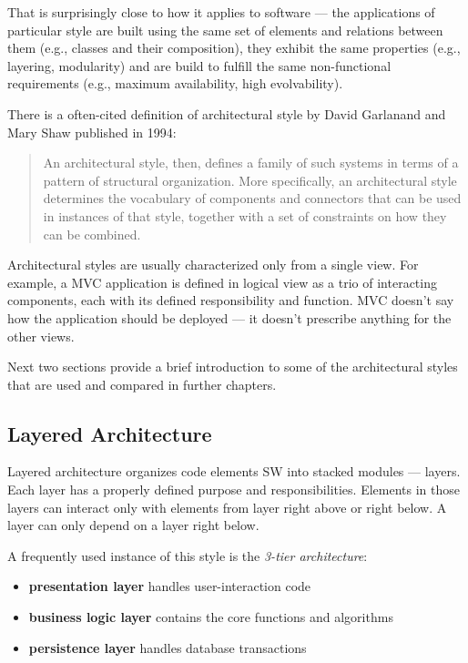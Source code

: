\documentclass[thesis=M,english,hidelinks]{FITthesis}[2012/10/20]
\begin{document}
That is surprisingly close to how it applies to software --- the applications of particular style are built using the same set of elements and relations between them (e.g., classes and their composition), they exhibit the same properties (e.g., layering, modularity) and are build to fulfill the same non-functional requirements (e.g., maximum availability, high evolvability).

There is a often-cited definition of architectural style by David Garlanand and Mary Shaw published in 1994:
\begin{quote}
An architectural style, then, defines a family of such systems in terms of a pattern of structural organization. More specifically, an architectural style determines the vocabulary of components and connectors that can be used in instances of that style, together with a set of constraints on how they can be combined.~\cite{sa-intro-garlan-shaw}
\end{quote}

Architectural styles are usually characterized only from a single view. For example, a \acrfull{MVC} application is defined in logical view as a trio of interacting components, each with its defined responsibility and function. \acrshort{MVC} doesn't say how the application should be deployed --- it doesn't prescribe anything for the other views. 

Next two sections provide a brief introduction to some of the architectural styles that are used and compared in further chapters.

\subsection{Layered Architecture}
Layered architecture organizes code elements \acrshort{SW} into stacked modules --- layers. Each layer has a properly defined purpose and responsibilities. Elements in those layers can interact only with elements from layer right above or right below. A layer can only depend on a layer right below.

A frequently used instance of this style is the \textit{3-tier architecture}:
\begin{itemize}
    \item \textbf{presentation layer} handles user-interaction code
    \item \textbf{business logic layer} contains the core functions and algorithms
    \item \textbf{persistence layer} handles database transactions
\end{itemize}
\end{document}
